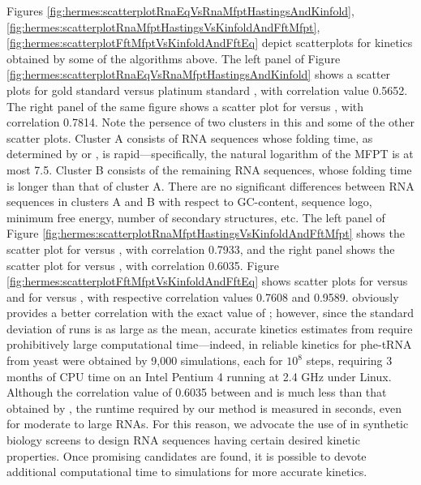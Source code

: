 Figures \ref{fig:hermes:scatterplotRnaEqVsRnaMfptHastingsAndKinfold},
\ref{fig:hermes:scatterplotRnaMfptHastingsVsKinfoldAndFftMfpt},
\ref{fig:hermes:scatterplotFftMfptVsKinfoldAndFftEq}
depict scatterplots for kinetics obtained by some of the algorithms
above. The left panel of
Figure \ref{fig:hermes:scatterplotRnaEqVsRnaMfptHastingsAndKinfold}
shows a scatter plots for gold standard \rnamfpt versus platinum
standard \rnaeq, with correlation value 0.5652. The right
panel of the same figure shows a scatter plot for \kinfold versus
\rnaeq, with correlation 0.7814. Note the persence of two
clusters in this and some of the other scatter plots. Cluster A
consists of RNA sequences whose folding time, as determined by \rnamfpt
or \rnaeq, is rapid---specifically, the natural
logarithm of the MFPT is at most 7.5. Cluster B consists of the
remaining RNA sequences, whose folding time is longer than that of
cluster A. There are no significant differences between RNA sequences
in clusters A and B with respect to GC-content, sequence logo, minimum
free energy, number of secondary structures, etc.  The left panel of
Figure \ref{fig:hermes:scatterplotRnaMfptHastingsVsKinfoldAndFftMfpt}
shows the scatter plot for \rnamfpt versus \kinfold, with
correlation 0.7933, and the right panel shows the scatter plot for
\rnamfpt versus \fftmfpt, with correlation 0.6035.
Figure \ref{fig:hermes:scatterplotFftMfptVsKinfoldAndFftEq}
shows scatter plots for \fftmfpt versus  and
for \fftmfpt versus , with respective
correlation values 0.7608 and 0.9589. \kinfold obviously provides
a better correlation with the exact value of \mfpt;
however, since the standard deviation of \kinfold runs is as
large as the mean, accurate kinetics estimates
from \kinfold require prohibitively large computational time---indeed, in
\citep{wolfingerstadler:kinetics} reliable kinetics for phe-tRNA from
yeast were obtained by 9,000 \kinfold simulations, each for $10^8$
steps, requiring 3 months of CPU time on an Intel Pentium 4 running at
2.4 GHz under Linux. Although the correlation value of 0.6035 between
\rnamfpt and \fftmfpt is much less than that obtained by \kinfold,
the runtime required by our method \fftmfpt is measured
in seconds, even for moderate to large RNAs. For this reason, we
advocate the use of \fftmfpt in synthetic biology screens to
design RNA sequences having certain desired kinetic properties. Once
promising candidates are found, it is possible to devote additional
computational time to \kinfold simulations for more accurate
kinetics.

